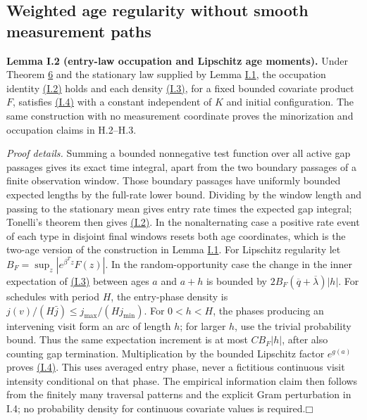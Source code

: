 \documentclass[11pt]{article}
\providecommand{\square}{\mdlgwhtsquare}
\begin{document}
\subsection{Weighted age regularity without smooth measurement paths}\label{sec:I.3}

\label{res:Lemma-I.2}
\textbf{Lemma I.2 (entry-law occupation and Lipschitz age moments).} Under Theorem \hyperref[res:Theorem-6]{6} and the stationary law supplied by Lemma \hyperref[res:Lemma-I.1]{I.1}, the occupation identity \hyperref[eq:I.2]{(I.2)} holds and each density \hyperref[eq:I.3]{(I.3)}, for a fixed bounded covariate product \(F\), satisfies \hyperref[eq:I.4]{(I.4)} with a constant independent of \(K\) and initial configuration. The same construction with no measurement coordinate proves the minorization and occupation claims in H.2--H.3.

\emph{Proof details.} Summing a bounded nonnegative test function over all active gap passages gives its exact time integral, apart from the two boundary passages of a finite observation window. Those boundary passages have uniformly bounded expected lengths by the full-rate lower bound. Dividing by the window length and passing to the stationary mean gives entry rate times the expected gap integral; Tonelli's theorem then gives \hyperref[eq:I.2]{(I.2)}. In the nonalternating case a positive rate event of each type in disjoint final windows resets both age coordinates, which is the two-age version of the construction in Lemma \hyperref[res:Lemma-I.1]{I.1}. For Lipschitz regularity let \(B_F=\sup_z|e^{\beta^Tz}F(z)|\). In the random-opportunity case the change in the inner expectation of \hyperref[eq:I.3]{(I.3)} between ages \(a\) and \(a+h\) is bounded by
\(2B_F(\overline q+\overline\lambda)|h|\).
For schedules with period \(H\), the entry-phase density is
\(j(v)/(H\bar j)\le j_{\max}/(Hj_{\min})\).
For \(0<h<H\), the phases producing an intervening visit form an arc of length \(h\); for larger \(h\), use the trivial probability bound. Thus the same expectation increment is at most \(C B_F|h|\), after also counting gap termination. Multiplication by the bounded Lipschitz factor \(e^{g(a)}\) proves \hyperref[eq:I.4]{(I.4)}. This uses averaged entry phase, never a fictitious continuous visit intensity conditional on that phase. The empirical information claim then follows from the finitely many traversal patterns and the explicit Gram perturbation in I.4; no probability density for continuous covariate values is required.\hfill$\square$
\end{document}
